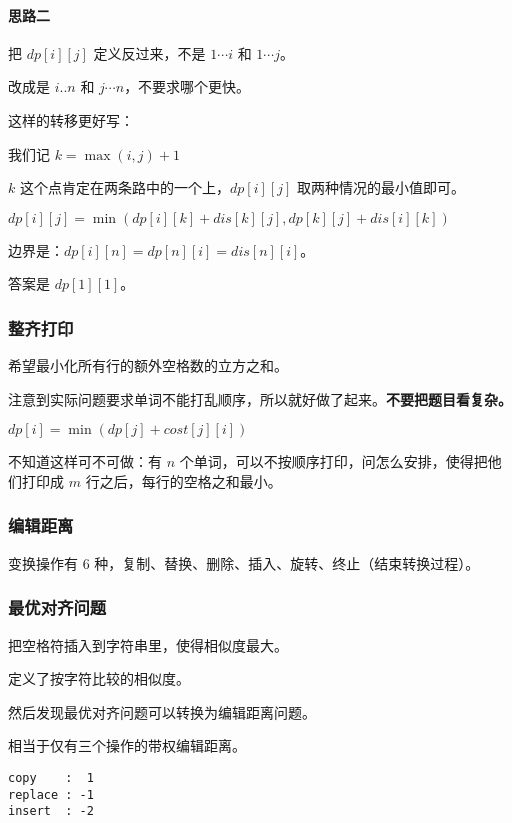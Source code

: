 \paragraph{思路二}

把 $dp[i][j]$ 定义反过来，不是 $1 \cdots i$ 和 $1 \cdots j$。

改成是 $i..n$ 和 $j \cdots n$，不要求哪个更快。

这样的转移更好写：

我们记 $k = \max(i, j) + 1$

$k$ 这个点肯定在两条路中的一个上，$dp[i][j]$ 取两种情况的最小值即可。

$dp[i][j] = \min(dp[i][k] + dis[k][j], dp[k][j] + dis[i][k])$

边界是：$dp[i][n] = dp[n][i] = dis[n][i]$。

答案是 $dp[1][1]$。

\subsubsection{整齐打印}

希望最小化所有行的额外空格数的立方之和。

注意到实际问题要求单词不能打乱顺序，所以就好做了起来。\textbf{不要把题目看复杂。}

$dp[i] = \min(dp[j] + cost[j][i])$

不知道这样可不可做：有 $n$ 个单词，可以不按顺序打印，问怎么安排，使得把他们打印成 $m$ 行之后，每行的空格之和最小。

\subsubsection{编辑距离}

变换操作有 $6$ 种，复制、替换、删除、插入、旋转、终止（结束转换过程）。

\subsubsection{最优对齐问题}

把空格符插入到字符串里，使得相似度最大。

定义了按字符比较的相似度。

然后发现最优对齐问题可以转换为编辑距离问题。

相当于仅有三个操作的带权编辑距离。

\begin{verbatim}
copy    :  1
replace : -1
insert  : -2
\end{verbatim}

